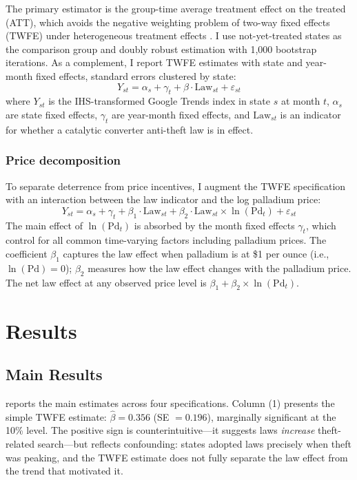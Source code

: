 \documentclass[12pt]{article}
\begin{document}
The primary estimator is the \citet{callaway2021difference} group-time average treatment effect on the treated (ATT), which avoids the negative weighting problem of two-way fixed effects (TWFE) under heterogeneous treatment effects \citep{goodman2021difference, dechaisemartin2020two}. I use not-yet-treated states as the comparison group and doubly robust estimation with 1,000 bootstrap iterations. As a complement, I report TWFE estimates with state and year-month fixed effects, standard errors clustered by state:
\begin{equation}
Y_{st} = \alpha_s + \gamma_t + \beta \cdot \text{Law}_{st} + \varepsilon_{st}
\end{equation}
where $Y_{st}$ is the IHS-transformed Google Trends index in state $s$ at month $t$, $\alpha_s$ are state fixed effects, $\gamma_t$ are year-month fixed effects, and $\text{Law}_{st}$ is an indicator for whether a catalytic converter anti-theft law is in effect.

\subsubsection*{Price decomposition} To separate deterrence from price incentives, I augment the TWFE specification with an interaction between the law indicator and the log palladium price:
\begin{equation}
Y_{st} = \alpha_s + \gamma_t + \beta_1 \cdot \text{Law}_{st} + \beta_2 \cdot \text{Law}_{st} \times \ln(\text{Pd}_t) + \varepsilon_{st}
\end{equation}
The main effect of $\ln(\text{Pd}_t)$ is absorbed by the month fixed effects $\gamma_t$, which control for all common time-varying factors including palladium prices. The coefficient $\beta_1$ captures the law effect when palladium is at \$1 per ounce (i.e., $\ln(\text{Pd}) = 0$); $\beta_2$ measures how the law effect changes with the palladium price. The net law effect at any observed price level is $\beta_1 + \beta_2 \times \ln(\text{Pd}_t)$.

\section{Results}

\subsection{Main Results}

 reports the main estimates across four specifications. Column (1) presents the simple TWFE estimate: $\hat{\beta} = 0.356$ (SE $= 0.196$), marginally significant at the 10\% level. The positive sign is counterintuitive---it suggests laws \textit{increase} theft-related search---but reflects confounding: states adopted laws precisely when theft was peaking, and the TWFE estimate does not fully separate the law effect from the trend that motivated it.
\end{document}
